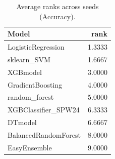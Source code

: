 \begin{table}[t]
\centering
\begin{tabular}{lr}
\toprule
Model & rank \\
\midrule
LogisticRegression & 1.3333 \\
sklearn_SVM & 1.6667 \\
XGBmodel & 3.0000 \\
GradientBoosting & 4.0000 \\
random_forest & 5.0000 \\
XGBClassifier_SPW24 & 6.3333 \\
DTmodel & 6.6667 \\
BalancedRandomForest & 8.0000 \\
EasyEnsemble & 9.0000 \\
\bottomrule
\end{tabular}
\caption{Average ranks across seeds (Accuracy).}
\label{tab:avg_rank_Accuracy}
\end{table}